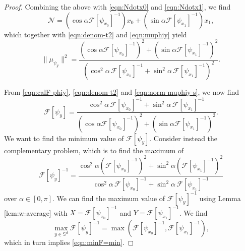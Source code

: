 \documentclass[11pt]{amsart}
\newcommand{\bbs}{\mathbb S}
\newcommand{\dm}{d} %
\begin{document}
\begin{proof}
Combining the above with \eqref{eqn:Ndotx0} and \eqref{eqn:Ndotx1}, we find
\[
\mathcal{N}=\left(\cos\alpha\mathcal{F}[\psi_{x_0}]^{-1}\right)x_0+\left(\sin\alpha\mathcal{F}[\psi_{x_1}]^{-1}\right)x_1,
\]
which together with \eqref{eqn:denom-t2} and \eqref{eqn:muphiy} yield
\begin{equation}
\label{eqn:norm-muphiy-s}
\|\mu_{\psi_y}\|^2=\frac{\left(\cos\alpha\mathcal{F}[\psi_{x_0}]^{-1}\right)^2+\left(\sin\alpha\mathcal{F}[\psi_{x_1}]^{-1}\right)^2}{\left(\cos^2\alpha \, \mathcal{F}[\psi_{x_0}]^{-1}+\sin^2\alpha \, \mathcal{F}[\psi_{x_1}]^{-1}\right)^2}.
\end{equation}

From \eqref{eqn:calF-phiy}, \eqref{eqn:denom-t2} and \eqref{eqn:norm-muphiy-s}, we now find
\[
\mathcal{F}[\psi_y]=\frac{\cos^2\alpha \, \mathcal{F}[\psi_{x_0}]^{-1}+\sin^2\alpha \, \mathcal{F}[\psi_{x_1}]^{-1}}{\left(\cos\alpha\mathcal{F}[\psi_{x_0}]^{-1}\right)^2+\left(\sin\alpha\mathcal{F}[\psi_{x_1}]^{-1}\right)^2}.
\]
We want to find the minimum value of $\mathcal{F}[\psi_y]$. Consider instead the complementary problem, which is to find the maximum of 
\[
\mathcal{F}[\psi_y]^{-1}=\frac{ \cos^2\alpha \left( \mathcal{F}[\psi_{x_0}]^{-1}\right)^2+ \sin^2\alpha \left( \mathcal{F}[\psi_{x_1}]^{-1}\right)^2}{\cos^2\alpha \, \mathcal{F}[\psi_{x_0}]^{-1}+\sin^2\alpha \, \mathcal{F}[\psi_{x_1}]^{-1}}
\]
over $\alpha \in [0,\pi]$. We can find the maximum value of $\mathcal{F}[\psi_y]^{-1}$ using Lemma \ref{lem:w-average} with $X=\mathcal{F}[\psi_{x_0}]^{-1}$ and $Y=\mathcal{F}[\psi_{x_1}]^{-1}$. We find
\[
\max_{y\in\bbs^\dm}\mathcal{F}[\psi_y]^{-1}=\max\left(\mathcal{F}[\psi_{x_0}]^{-1},\mathcal{F}[\psi_{x_1}]^{-1}\right),
\]
which in turn implies \eqref{eqn:minF=min}.
\end{proof}
\end{document}

